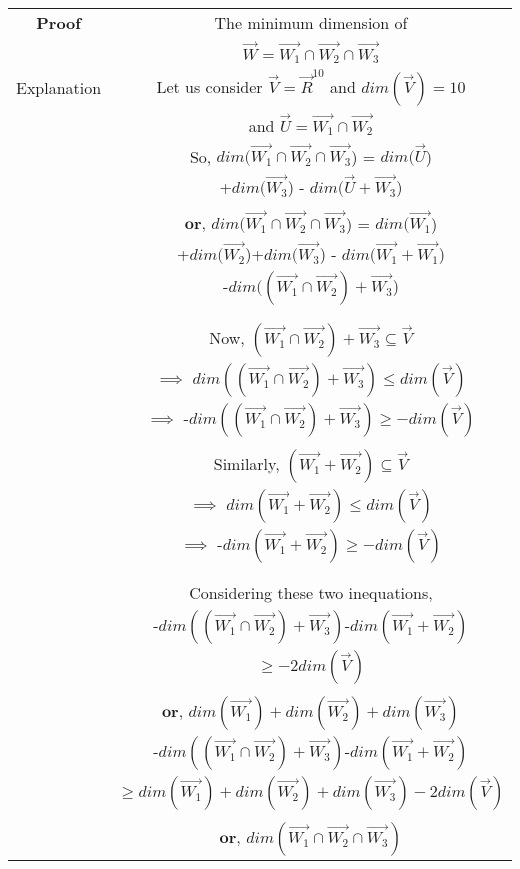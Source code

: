 \documentclass[journal,12pt,onecolumn]{IEEEtran}
\begin{document}
\begin{longtable}{|c|c|}
\textbf{Proof} & The minimum dimension of \\
& $\vec{W} = \vec{W_1} \cap \vec{W_2} \cap \vec{W_3}$ \\
\hline
Explanation & Let us consider $\vec{V}=\vec{R}^{10}$ and $dim(\vec{V})=10$\\
& and $\vec{U} = \vec{W_1} \cap \vec{W_2}$\\
& So, $dim(\vec{W_1} \cap \vec{W_2} \cap \vec{W_3}$) = $dim(\vec{U}$)\\
& +$dim(\vec{W_3}$) - $dim(\vec{U}+\vec{W_3}$)\\
& \\
& $\textbf{or,}$ $dim(\vec{W_1} \cap \vec{W_2} \cap \vec{W_3}$) = $dim(\vec{W_1}$)\\
& +$dim(\vec{W_2}$)+$dim(\vec{W_3}$) - $dim(\vec{W_1}+\vec{W_1}$)\\
& -$dim((\vec{W_1} \cap \vec{W_2})+\vec{W_3}$)\\
& \\
\hline
& \\
& Now, $(\vec{W_1} \cap \vec{W_2})+\vec{W_3} \subseteq \vec{V}$\\
& $\implies$ $dim((\vec{W_1} \cap \vec{W_2})+\vec{W_3})\leq dim(\vec{V})$\\
& $\implies$ -$dim((\vec{W_1} \cap \vec{W_2})+\vec{W_3})\geq -dim(\vec{V})$\\
& \\
& Similarly, $(\vec{W_1}+\vec{W_2})\subseteq \vec{V}$\\
& $\implies$ $dim(\vec{W_1}+\vec{W_2})\leq dim(\vec{V})$\\
& $\implies$ -$dim(\vec{W_1}+\vec{W_2})\geq -dim(\vec{V})$\\
& \\
\hline
& \\
& Considering these two inequations,\\
& -$dim((\vec{W_1} \cap \vec{W_2})+\vec{W_3})$-$dim(\vec{W_1}+\vec{W_2})$\\
& $\geq -2dim(\vec{V})$\\
& \\
& $\textbf{or,}$  $dim(\vec{W_1})+dim(\vec{W_2})+dim(\vec{W_3})$\\
& -$dim((\vec{W_1} \cap \vec{W_2})+\vec{W_3})$-$dim(\vec{W_1}+\vec{W_2})$\\
& $\geq dim(\vec{W_1})+dim(\vec{W_2})+dim(\vec{W_3})-2dim(\vec{V})$\\
& \\
& $\textbf{or,}$ $dim(\vec{W_1} \cap \vec{W_2} \cap \vec{W_3})$\\

\end{longtable}
\end{document}
